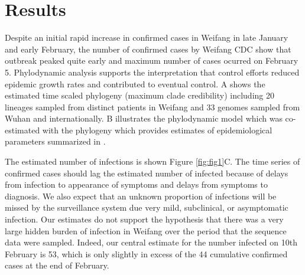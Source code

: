 \documentclass[9pt,lineno,onehalfspacing]{elife}
\begin{document}
\section{Results}

Despite an initial rapid increase in confirmed cases in Weifang in late January and early February, the number of confirmed cases by Weifang CDC show that outbreak peaked quite early and maximum number of cases ocurred on February 5. 
Phylodynamic analysis supports the interpretation that control efforts reduced epidemic growth rates and contributed to eventual control. 
A shows the estimated time scaled phylogeny (maximum clade credibility) including 20 lineages sampled from distinct patients in Weifang and 33 genomes sampled from Wuhan and internationally. 
B illustrates the phylodynamic model which was co-estimated with the phylogeny which provides estimates of epidemiological parameters summarized in .

The estimated number of infections is shown Figure \ref{fig:fig1}C.
The time series of confirmed cases should lag the estimated number of infected because of delays from infection to appearance of symptoms and delays from symptoms to diagnosis. 
We also expect that an unknown proportion of infections will be missed by the surveillance system due very mild, subclinical, or asymptomatic infection. 
Our estimates do not support the hypothesis that there was a very large hidden burden of infection in Weifang over the period that the sequence data were sampled. 
Indeed, our central estimate for the number infected on 10th February is 53, which is only slightly in excess of the 44 cumulative confirmed cases at the end of February. 
\end{document}

